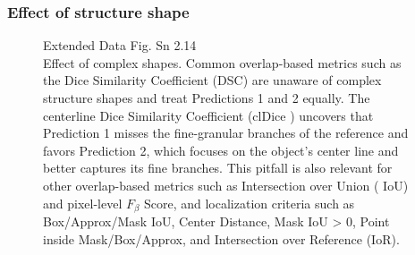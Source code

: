\documentclass[11pt]{article}
\begin{document}




\subsubsection{Effect of structure shape}

\begin{figure}[H]
    \centering
    \caption{Extended Data Fig. Sn 2.14~\cite{pitfalls-in-segmentation-evaluation}\\Effect of complex shapes. Common overlap-based metrics such as the
    Dice Similarity Coefficient (DSC) are unaware of complex structure shapes and treat Predictions 1
    and 2 equally. The centerline Dice Similarity Coefficient (clDice ) uncovers that Prediction 1 misses
    the fine-granular branches of the reference and favors Prediction 2, which focuses on the object’s
    center line and better captures its fine branches. This pitfall is also relevant for other overlap-based
    metrics such as Intersection over Union ( IoU) and pixel-level $F_\beta$ Score, and localization criteria
    such as Box/Approx/Mask IoU, Center Distance, Mask IoU > 0, Point inside Mask/Box/Approx, and
    Intersection over Reference (IoR).}
\end{figure}
\end{document}
